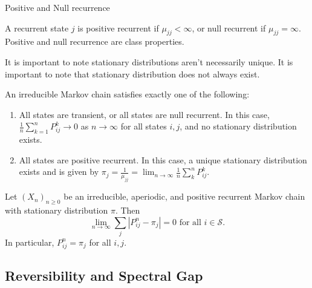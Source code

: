 \begin{defn}{Positive and Null recurrence}{}

    A recurrent state \( j \) is positive recurrent if \( \mu _{jj} < \infty  \), or null recurrent if \( \mu _{jj} = \infty  \). Positive and null recurrence are class properties.

\end{defn}

It is important to note stationary distributions aren't necessarily unique. It is important to note that stationary distribution does not always exist. 

\begin{thrm}{}{}
An irreducible Markov chain satisfies exactly one of the following:
\begin{enumerate}
    \item All states are transient, or all states are null recurrent. In this case, \( \frac{1}{n}\sum_{k = 1}  ^n P_{ij}^k \to 0 \) as \( n \to \infty  \) for all states \( i,j \), and no stationary distribution exists. 
    \item All states are positive recurrent. In this case, a unique stationary distribution exists and is given by \( \pi _{j} = \frac{1}{\mu _{ j j }} = \lim_{n \to \infty} \frac{1}{n}\sum_{k}^n P^k_{ij}  \). 
\end{enumerate}


\end{thrm}

\begin{thrm}{}{}
    Let \( (X_{n} )_{n\geq 0} \) be an irreducible, aperiodic, and positive recurrent Markov chain with stationary distribution \( \pi \). Then
    \[
        \lim_{n \to \infty} \sum_{j} \left\lvert P_{ij}^n - \pi _{j}   \right\rvert = 0 \text{ for all  } i  \in \mathcal{S} . 
    \] In particular, \( P^n_{ij}  = \pi _{j}\) for all \( i, j \). 
    \end{thrm}

\subsection{Reversibility and Spectral Gap}